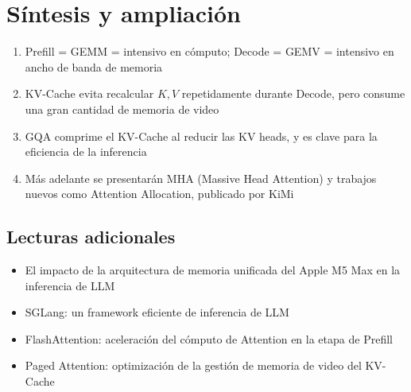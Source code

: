 \section{Síntesis y ampliación}

\begin{enumerate}
  \item Prefill = GEMM = intensivo en cómputo; Decode = GEMV = intensivo en ancho de banda de memoria
  \item KV-Cache evita recalcular $K, V$ repetidamente durante Decode, pero consume una gran cantidad de memoria de video
  \item GQA comprime el KV-Cache al reducir las KV heads, y es clave para la eficiencia de la inferencia
  \item Más adelante se presentarán MHA (Massive Head Attention) y trabajos nuevos como Attention Allocation, publicado por KiMi
\end{enumerate}

\subsection{Lecturas adicionales}
\begin{itemize}
  \item El impacto de la arquitectura de memoria unificada del Apple M5 Max en la inferencia de LLM
  \item SGLang: un framework eficiente de inferencia de LLM
  \item FlashAttention: aceleración del cómputo de Attention en la etapa de Prefill
  \item Paged Attention: optimización de la gestión de memoria de video del KV-Cache
\end{itemize}


